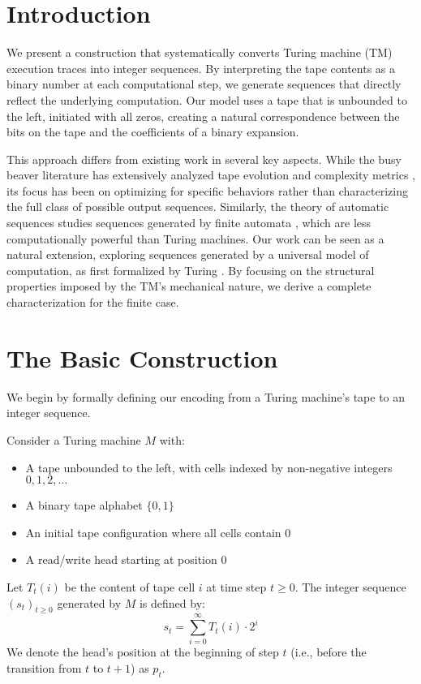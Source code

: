 
\chapter{Introduction}

We present a construction that systematically converts Turing machine (TM) execution traces into integer sequences. By interpreting the tape contents as a binary number at each computational step, we generate sequences that directly reflect the underlying computation. Our model uses a tape that is unbounded to the left, initiated with all zeros, creating a natural correspondence between the bits on the tape and the coefficients of a binary expansion.

This approach differs from existing work in several key aspects. While the busy beaver literature has extensively analyzed tape evolution and complexity metrics \cite{marxen1990,michel2015}, its focus has been on optimizing for specific behaviors rather than characterizing the full class of possible output sequences. Similarly, the theory of automatic sequences studies sequences generated by finite automata \cite{allouche2003}, which are less computationally powerful than Turing machines. Our work can be seen as a natural extension, exploring sequences generated by a universal model of computation, as first formalized by Turing \cite{turing1936}. By focusing on the structural properties imposed by the TM's mechanical nature, we derive a complete characterization for the finite case.

\chapter{The Basic Construction}

We begin by formally defining our encoding from a Turing machine's tape to an integer sequence.

\begin{definition}
\label{def:encoding}
\leanok
Consider a Turing machine $M$ with:
\begin{itemize}
\item A tape unbounded to the left, with cells indexed by non-negative integers $0, 1, 2, \ldots$
\item A binary tape alphabet $\{0, 1\}$
\item An initial tape configuration where all cells contain $0$
\item A read/write head starting at position $0$
\end{itemize}
Let $T_t(i)$ be the content of tape cell $i$ at time step $t \geq 0$. The integer sequence $(s_t)_{t \geq 0}$ generated by $M$ is defined by:
$$s_t = \sum_{i=0}^{\infty} T_t(i) \cdot 2^i$$
We denote the head's position at the beginning of step $t$ (i.e., before the transition from $t$ to $t+1$) as $p_t$.
\end{definition}


